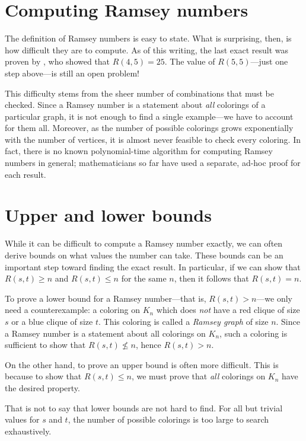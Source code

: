 \documentclass{article}
\begin{document}
\section{Computing Ramsey numbers}

The definition of Ramsey numbers is easy to state. What is surprising, then, is how difficult they are to compute. As of this writing, the last exact result was proven by \cite{JGT:JGT3190190304}, who showed that $R(4,5) = 25$. The value of $R(5,5)$---just one step above---is still an open problem!


This difficulty stems from the sheer number of combinations that must be checked. Since a Ramsey number is a statement about \emph{all} colorings of a particular graph, it is not enough to find a single example---we have to account for them all. Moreover, as the number of possible colorings grows exponentially with the number of vertices, it is almost never feasible to check every coloring. In fact, there is no known polynomial-time algorithm for computing Ramsey numbers in general; mathematicians so far have used a separate, ad-hoc proof for each result.

\section{Upper and lower bounds}

While it can be difficult to compute a Ramsey number exactly, we can often derive bounds on what values the number can take. These bounds can be an important step toward finding the exact result. In particular, if we can show that $R(s,t) \geq n$ and $R(s,t) \leq n$ for the same $n$, then it follows that $R(s,t) = n$.

To prove a lower bound for a Ramsey number---that is, $R(s,t) > n$---we only need a counterexample: a coloring on $K_n$ which does \emph{not} have a red clique of size $s$ or a blue clique of size $t$. This coloring is called a \textit{Ramsey graph} of size $n$. Since a Ramsey number is a statement about all colorings on $K_n$, such a coloring is sufficient to show that $R(s,t) \nleq n$, hence $R(s,t) > n$.

On the other hand, to prove an upper bound is often more difficult. This is because to show that $R(s,t) \leq n$, we must prove that \emph{all} colorings on $K_n$ have the desired property.

That is not to say that lower bounds are not hard to find. For all but trivial values for $s$ and $t$, the number of possible colorings is too large to search exhaustively.  
\end{document}
